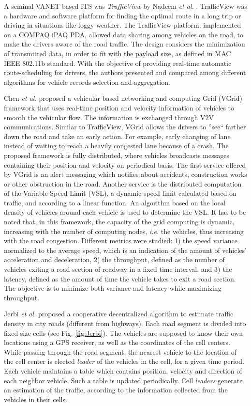 \documentclass[10pt,onecolumn]{article}
\begin{document}
A seminal VANET-based ITS was \textit{TrafficView} by Nadeem \textit{et al.} \cite{Nadeem2004}.
TrafficView was a hardware and software platform for finding the optimal route in a long trip or driving in situations like foggy weather. 
The TrafficView platform, implemented on a COMPAQ iPAQ PDA, allowed data sharing among vehicles on the road, to make the drivers aware of the road traffic. 
The design considers the minimization of transmitted data, in order to fit with the payload size, as defined in MAC IEEE 802.11b standard.
With the objective of providing real-time automatic route-scheduling for drivers, the authors presented and compared among different algorithms for vehicle records selection and aggregation.

Chen \textit{et al.} \cite{Chen2006} proposed a vehicular based networking and computing Grid (VGrid) framework that uses real-time position and velocity information of vehicles to smooth the vehicular flow. The information is exchanged through V2V communications. 
Similar to TrafficView, VGrid allows the drivers to ''see`` farther down the road and take an early action. 
For example, early changing of lane instead of waiting to reach a heavily congested lane because of a crash.
The proposed framework is fully distributed, where vehicles broadcasts messages containing their position and velocity on periodical basis. 
The first service offered by VGrid is an alert messaging which notifies about accidents, construction works or other obstruction in the road. 
Another service is the distributed computation of the Variable Speed Limit (VSL), a dynamic speed limit calculated based on traffic, and according to a linear function. 
An algorithm based on the local density of vehicles around each vehicle is used to determine the VSL. 
It has to be noted that, in this framework, the capacity of the grid computing is dynamic, increasing with the number of computing nodes, \textit{i.e.} the vehicles, thus increasing with the road congestion.
Different metrics were studied: 1) the speed variance normalized to the average speed, which is an indication of the amount of vehicles' acceleration and deceleration, 2) the throughput, defined as the number of vehicles exiting a road section of roadway in a fixed time interval, and 3) the latency, defined as the amount of time the vehicle takes to exit a road section. 
The objective is to minimize both variance and latency while maximizing throughput.

Jerbi \textit{et al.} \cite{Jerbi2007} proposed a cooperative decentralized algorithm to estimate traffic density in city roads (different from highways). 
Each road segment is divided into fixed-size cells (see Fig. \ref{fig:Jerbi}). The vehicles are supposed to know their own locations using a GPS receiver, as well as the coordinates of the cell centers.
While passing through the road segment, the nearest vehicle to the location of the cell center is elected \textit{leader} of the vehicles in the cell, for a given time period. 
Each vehicle maintains a table which contains position, velocity and direction of each neighbor vehicle. Such a table is updated periodically. Cell \textit{leaders} generate an estimation of the traffic, according to the information collected from the vehicles in their cells. 
\end{document}
